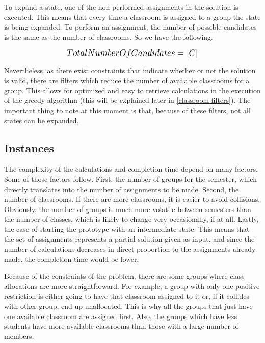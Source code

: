 To expand a state, one of the non performed assignments in the solution is executed. This means that every time a classroom is assigned to a group the state is being expanded. To perform an assignment, the number of possible candidates is the same as the number of classrooms. So we have the following.

\begin{equation}
    \scalebox{1.2}{$TotalNumberOfCandidates = \left|C\right|$}
\end{equation}

Nevertheless, as there exist constraints that indicate whether or not the solution is valid, there are filters which reduce the number of available classrooms for a group. This allows for optimized and easy to retrieve calculations in the execution of the greedy algorithm (this will be explained later in \ref{classroom-filters}). The important thing to note at this moment is that, because of these filters, not all states can be expanded.

\subsection{Instances}

The complexity of the calculations and completion time depend on many factors. Some of those factors follow. First, the number of groups for the semester, which directly translates into the number of assignments to be made. Second, the number of classrooms. If there are more classrooms, it is easier to avoid collisions. Obviously, the number of groups is much more volatile between semesters than the number of classes, which is likely to change very occasionally, if at all. Lastly, the case of starting the prototype with an intermediate state. This means that the set of assignments represents a partial solution given as input, and since the number of calculations decreases in direct proportion to the assignments already made, the completion time would be lower.

Because of the constraints of the problem, there are some groups where class allocations are more straightforward. For example, a group with only one positive restriction is either going to have that classroom assigned to it or, if it collides with other group, end up unallocated. This is why all the groups that just have one available classroom are assigned first. Also, the groups which have less students have more available classrooms than those with a large number of members.



